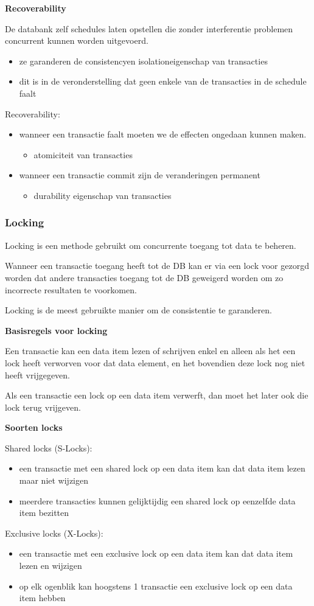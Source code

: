 \documentclass[a4paper,12pt]{article}
\begin{document}
\textbf{Recoverability}

De databank zelf schedules laten opstellen die zonder interferentie problemen concurrent kunnen worden uitgevoerd.
\begin{itemize}
\item ze garanderen de consistencyen isolationeigenschap van transacties
\item dit is in de veronderstelling dat geen enkele van de transacties in de schedule faalt
\end{itemize}
Recoverability:
\begin{itemize}
\item wanneer een transactie faalt moeten we de effecten ongedaan kunnen maken.
	\begin{itemize}
	\item atomiciteit van transacties
	\end{itemize}
\item wanneer een transactie commit zijn de veranderingen permanent
	\begin{itemize}
	\item durability eigenschap van transacties
	\end{itemize}
\end{itemize}

\subsubsection{Locking}
Locking is een methode gebruikt om concurrente toegang tot data te beheren.

Wanneer een transactie toegang heeft tot de DB kan er via een lock voor gezorgd worden dat andere transacties toegang tot de DB geweigerd worden om zo incorrecte resultaten te voorkomen.

Locking is de meest gebruikte manier om de consistentie te garanderen.

\textbf{Basisregels voor locking}

Een transactie kan een data item lezen of schrijven enkel en alleen als het een lock heeft verworven voor dat data element, en het bovendien deze lock nog niet heeft vrijgegeven.

Als een transactie een lock op een data item verwerft, dan moet het later ook die lock terug vrijgeven.

\textbf{Soorten locks}

Shared locks (S-Locks):
\begin{itemize}
\item een transactie met een shared lock op een data item kan dat data item lezen maar niet wijzigen
\item meerdere transacties kunnen gelijktijdig een shared lock op eenzelfde data item bezitten
\end{itemize}
Exclusive locks (X-Locks):
\begin{itemize}
\item een transactie met een exclusive lock op een data item kan dat data item lezen en wijzigen
\item op elk ogenblik kan hoogstens 1 transactie een exclusive lock op een data item hebben
\end{itemize}
\end{document}
